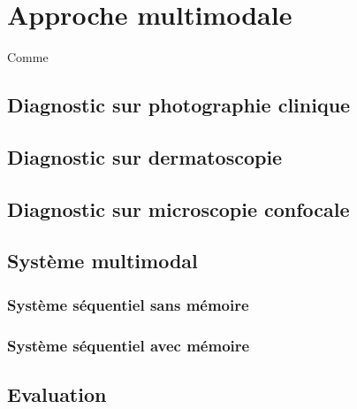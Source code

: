 \renewcommand{\thechapter}{\arabic{chapter}}
\setcounter{chapter}{6}

\chapter{Approche multimodale}
\label{chap:chapter_7}
\chapterintro
Comme 	
\newpage

\section{Diagnostic sur photographie clinique}
\section{Diagnostic sur dermatoscopie}
\section{Diagnostic sur microscopie confocale}
\section{Système multimodal}
\subsection{Système séquentiel sans mémoire}
\subsection{Système séquentiel avec mémoire}
\section{Evaluation}